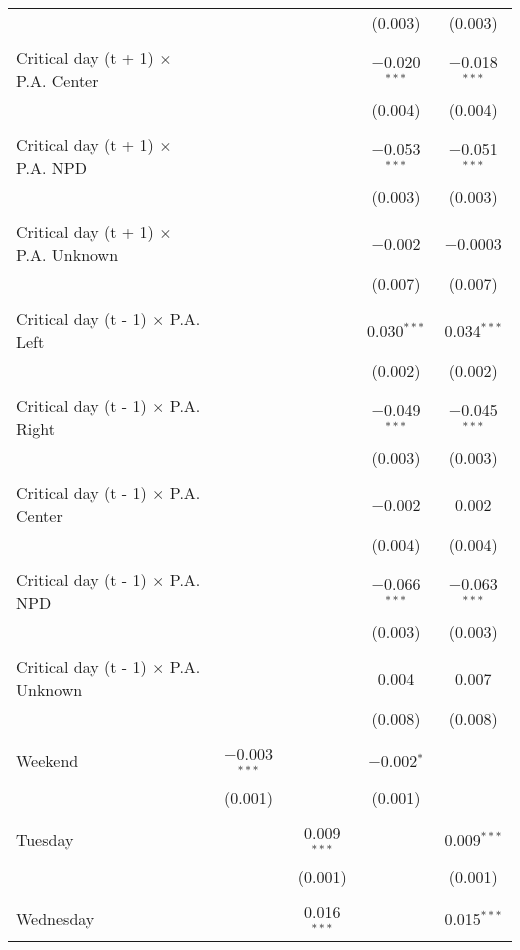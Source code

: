 \documentclass[
]{article}
\begin{document}
\begin{table}[!htbp]
{\begin{tabular}{@{\extracolsep{5pt}}lcccc}
  &  &  & (0.003) & (0.003) \\ 
  & & & & \\ 
 Critical day (t + 1) $\times$ P.A. Center &  &  & $-$0.020$^{***}$ & $-$0.018$^{***}$ \\ 
  &  &  & (0.004) & (0.004) \\ 
  & & & & \\ 
 Critical day (t + 1) $\times$ P.A. NPD &  &  & $-$0.053$^{***}$ & $-$0.051$^{***}$ \\ 
  &  &  & (0.003) & (0.003) \\ 
  & & & & \\ 
 Critical day (t + 1) $\times$ P.A. Unknown &  &  & $-$0.002 & $-$0.0003 \\ 
  &  &  & (0.007) & (0.007) \\ 
  & & & & \\ 
 Critical day (t - 1) $\times$ P.A. Left &  &  & 0.030$^{***}$ & 0.034$^{***}$ \\ 
  &  &  & (0.002) & (0.002) \\ 
  & & & & \\ 
 Critical day (t - 1) $\times$ P.A. Right &  &  & $-$0.049$^{***}$ & $-$0.045$^{***}$ \\ 
  &  &  & (0.003) & (0.003) \\ 
  & & & & \\ 
 Critical day (t - 1) $\times$ P.A. Center &  &  & $-$0.002 & 0.002 \\ 
  &  &  & (0.004) & (0.004) \\ 
  & & & & \\ 
 Critical day (t - 1) $\times$ P.A. NPD &  &  & $-$0.066$^{***}$ & $-$0.063$^{***}$ \\ 
  &  &  & (0.003) & (0.003) \\ 
  & & & & \\ 
 Critical day (t - 1) $\times$ P.A. Unknown &  &  & 0.004 & 0.007 \\ 
  &  &  & (0.008) & (0.008) \\ 
  & & & & \\ 
 Weekend & $-$0.003$^{***}$ &  & $-$0.002$^{*}$ &  \\ 
  & (0.001) &  & (0.001) &  \\ 
  & & & & \\ 
 Tuesday &  & 0.009$^{***}$ &  & 0.009$^{***}$ \\ 
  &  & (0.001) &  & (0.001) \\ 
  & & & & \\ 
 Wednesday &  & 0.016$^{***}$ &  & 0.015$^{***}$ \\ 

\end{tabular}}
\end{table}
\end{document}
